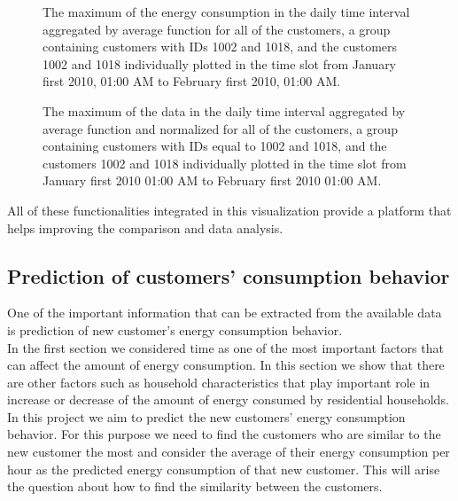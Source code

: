 \documentclass{sig-alternate-10pt}
\begin{document}
\begin{figure}
\centering
{}
\caption{The maximum of the energy consumption in the daily time interval aggregated by average function for all of the customers, a group containing customers with IDs 1002 and 1018, and the customers 1002 and 1018 individually plotted in the time slot from January first 2010, 01:00 AM to February first 2010, 01:00 AM.}
\end{figure}

\begin{figure}
\centering
{}
\caption{The maximum of the data in the daily time interval aggregated by average function and normalized for all of the customers, a group containing customers with IDs equal to 1002 and 1018, and the customers 1002 and 1018 individually plotted in the time slot from January first 2010 01:00 AM to February first 2010 01:00 AM.}
\end{figure}

All of these functionalities integrated in this visualization provide a platform that helps improving the comparison and data analysis.\\


\subsection{Prediction of customers' consumption behavior}

One of the important information that can be extracted from the available data is prediction of new customer's energy consumption behavior.\\
 
In the first section we considered time as one of the most important factors that can affect the amount of energy consumption. In this section we show that there are other factors such as household characteristics that play important role in increase or decrease of the amount of energy consumed by residential households.\\
 
In this project we aim to predict the new customers' energy consumption behavior. For this purpose we need to find the customers who are similar to the new customer the most and consider the average of their energy consumption per hour as the predicted energy consumption of that new customer. This will arise the question about how to find the similarity between the customers.\\ 
\end{document}

